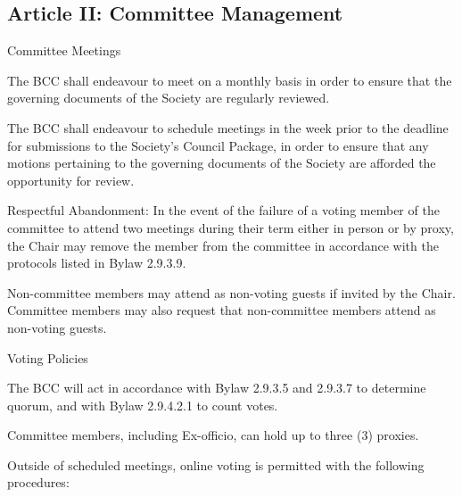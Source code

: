 \subsection{Article II: Committee Management}
\begin{longenum}[ label*=\thesubsection.\arabic*., align=left] 
\item Committee Meetings
	\begin{longenum}[ label*=\arabic*., align=left] 
	\item The BCC shall endeavour to meet on a monthly basis in order to ensure that the governing documents of the Society are regularly reviewed.
	\item The BCC shall endeavour to schedule meetings in the week prior to the deadline for submissions to the Society's Council Package, in order to ensure that any motions pertaining to the governing documents of the Society are afforded the opportunity for review.
	\item Respectful Abandonment: In the event of the failure of a voting member of the committee to attend two meetings during their term either in person or by proxy, the Chair may remove the member from the committee in accordance with the protocols listed in Bylaw 2.9.3.9.
	\item Non-committee members may attend as non-voting guests if invited by the Chair. Committee members may also request that non-committee members attend as non-voting guests.
	\end{longenum}

\item Voting Policies
	\begin{longenum}[ label*=\arabic*., align=left] 
	\item The BCC  will act in accordance with Bylaw 2.9.3.5 and 2.9.3.7 to determine quorum, and with Bylaw 2.9.4.2.1 to count votes.
	\item Committee members, including Ex-officio, can hold up to three (3) proxies.
	\item Outside of scheduled meetings, online voting is permitted with the following procedures:


\end{longenum}
\end{longenum}
